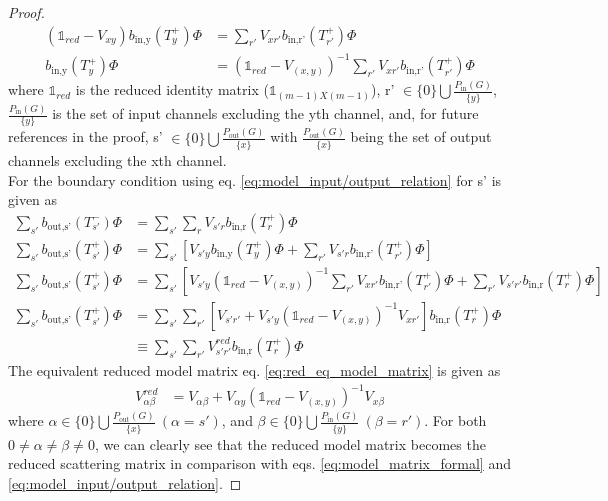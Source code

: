 \documentclass[a4paper]{article}
\theoremstyle{definition}
\begin{document}
\begin{enumerate}[label=(\roman*)]
\begin{proof}
\begin{align}
    (\mathbb{1}_{red}-V_{xy})b_{\text{in,y}}(T^+_{y})\Phi & = \sum_{r'}V_{xr'}b_{\text{in,r'}}(T^+_{r'})\Phi \nonumber \\
     b_{\text{in,y}}(T^+_{y})\Phi & = (\mathbb{1}_{red}-V_{(x,y)})^{-1}\sum_{r'}V_{xr'}b_{\text{in,r'}}(T^+_{r'})\Phi
\end{align}
where $\mathbb{1}_{red}$ is the reduced identity matrix ($\mathbb{1}_{(m-1)X(m-1)}$), r' $\in \{0\} \bigcup \frac{P_{\text{in}}(G)}{\{y\}}$, $\frac{P_{\text{in}}(G)}{\{y\}}$ is the set of input channels excluding the yth channel, and, for future references in the proof,  s' $\in \{0\} \bigcup \frac{P_{\text{out}}(G)}{\{x\}}$ with $\frac{P_{\text{out}}(G)}{\{x\}}$ being the set of output channels excluding the xth channel.  \\
For the boundary condition using eq. \ref{eq:model_input/output_relation} for s' is given as 
\begin{align}
      \sum_{s'}b_{\text{out,s'}}(T^-_{s'})\Phi & = \sum_{s'}\sum_{r}V_{s'r}b_{\text{in,r}}(T^+_{r})\Phi  \nonumber \\
       \sum_{s'}b_{\text{out,s'}}(T^+_{s'})\Phi & = \sum_{s'}[V_{s'y} b_{\text{in,y}}(T^+_{y})\Phi + \sum_{r'}V_{s'r}b_{\text{in,r'}}(T^+_{r'})\Phi] \nonumber \\
       \sum_{s'}b_{\text{out,s'}}(T^+_{s'})\Phi & = \sum_{s'}[V_{s'y} (\mathbb{1}_{red}-V_{(x,y)})^{-1}\sum_{r'}V_{xr'}b_{\text{in,r'}}(T^+_{r'})\Phi + \sum_{r'}V_{s'r'}b_{\text{in,r}}(T^+_{r})\Phi] \nonumber \\
        \sum_{s'}b_{\text{out,s'}}(T^+_{s'})\Phi & = \sum_{s'}\sum_{r'}[V_{s'r'} + V_{s'y}(\mathbb{1}_{red}-V_{(x,y)})^{-1}V_{xr'}]b_{\text{in,r}}(T^+_{r})\Phi \nonumber \\
        & \equiv \sum_{s'}\sum_{r'} V_{s'r'}^{red}b_{\text{in,r}}(T^+_{r})\Phi \label{eq:red_eq_model_matrix}
\end{align}
The equivalent reduced model matrix eq. \ref{eq:red_eq_model_matrix} is given as
\begin{align}
    V_{\alpha \beta}^{red} & = V_{\alpha \beta} + V_{\alpha y}(\mathbb{1}_{red}-V_{(x,y)})^{-1}V_{x\beta}
\end{align}
where $\alpha \in \{0\} \bigcup \frac{P_{\text{out}}(G)}{\{x\}} \ (\alpha = s')$, and $\beta \in \{0\} \bigcup \frac{P_{\text{in}}(G)}{\{y\}} \ (\beta = r')$. For both $0 \ne \alpha \ne \beta \ne 0$, we can clearly see that the reduced model matrix becomes the reduced scattering matrix in comparison with eqs. \ref{eq:model_matrix_formal} and \ref{eq:model_input/output_relation}. 

\end{proof}
\end{enumerate}
\end{document}
